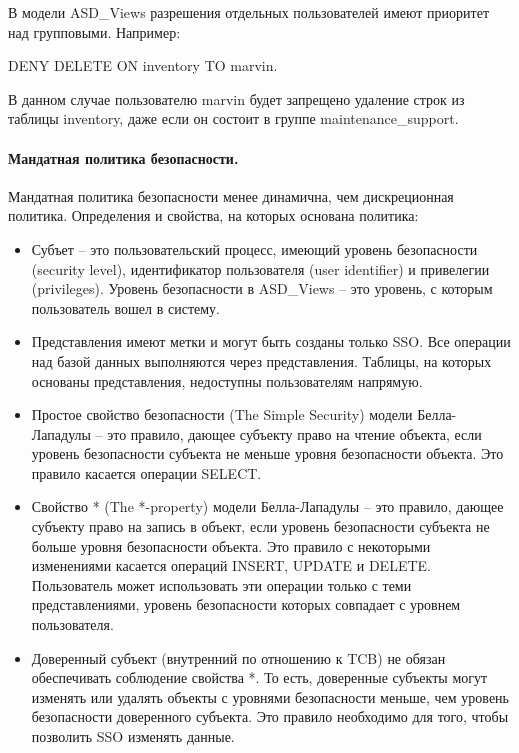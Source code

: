 В модели ASD\_Views разрешения отдельных пользователей имеют приоритет над групповыми. Например:
\begin{center}
    DENY DELETE ON inventory TO marvin.
\end{center}
В данном случае пользователю marvin будет запрещено удаление строк из таблицы inventory, 
даже если он состоит в группе maintenance\_support.

\paragraph{Мандатная политика безопасности.}

Мандатная политика безопасности менее динамична, чем дискреционная политика. Определения и свойства, 
на которых основана политика:
\begin{itemize}
    \item Субъет – это пользовательский процесс, имеющий уровень безопасности (security level), 
    идентификатор пользователя (user identifier) и привелегии (privileges). 
    Уровень безопасности в ASD\_Views – это уровень, с которым пользователь вошел в систему.
    \item Представления имеют метки и могут быть созданы только SSO. 
    Все операции над базой данных выполняются через представления. 
    Таблицы, на которых основаны представления, недоступны пользователям напрямую.
    \item Простое свойство безопасности (The Simple Security) модели Белла-Лападулы – это правило, 
    дающее субъекту право на чтение объекта, если уровень безопасности субъекта не меньше уровня безопасности объекта. 
    Это правило касается операции SELECT.
    \item Свойство * (The *-property)  модели Белла-Лападулы – это правило, дающее субъекту право на запись в объект, 
    если уровень безопасности субъекта не больше уровня безопасности объекта. 
    Это правило с некоторыми изменениями касается операций INSERT, UPDATE и DELETE. 
    Пользователь может использовать эти операции только с теми  представлениями, 
    уровень безопасности которых совпадает с уровнем пользователя.
    \item Доверенный субъект (внутренний по отношению к TCB) не обязан обеспечивать соблюдение свойства *. 
    То есть, доверенные субъекты могут изменять или удалять объекты с уровнями безопасности меньше, 
    чем уровень безопасности доверенного субъекта. Это правило необходимо для того, чтобы позволить SSO изменять данные.
\end{itemize}

